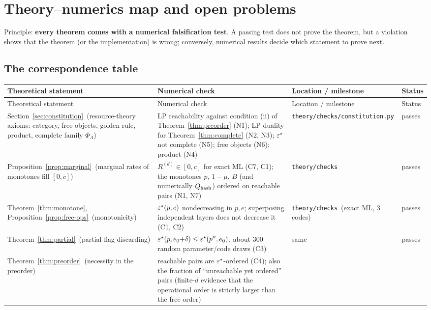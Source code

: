 \section{Theory--numerics map and open problems}\label{sec:map}

Principle: \textbf{every theorem comes with a numerical falsification test}. A passing test does not prove the theorem, but a violation shows that the theorem (or the implementation) is wrong;
conversely, numerical results decide which statement to prove next.

\subsection{The correspondence table}

{\footnotesize
\begin{longtable}{p{3.7cm} p{4.5cm} p{3.2cm} p{2.6cm}}
\toprule
Theoretical statement & Numerical check & Location / milestone & Status \\
\midrule
\endfirsthead
\toprule
Theoretical statement & Numerical check & Location / milestone & Status \\
\midrule
\endhead
Section~\ref{sec:constitution}\ (resource-theory axioms: category, free objects, golden rule, product, complete family $\Phi_\Lambda$) &
LP reachability against condition (ii) of Theorem~\ref{thm:preorder} (N1); LP duality for Theorem~\ref{thm:complete} (N2, N3); $\varepsilon^{\star}$ not complete (N5); free objects (N6); product (N4) &
\texttt{theory/checks/constitution.py} & passes \\
Proposition~\ref{prop:marginal}\ (marginal rates of monotones fill $[0,c]$) &
$R^{(d)}\in[0,c]$ for exact ML (C7, C1); the monotones $p$, $1-\mu$, $B$ (and numerically $Q_{\rm hash}$) ordered on reachable pairs (N1, N7) &
\texttt{theory/checks} & passes \\
Theorem~\ref{thm:monotone}, Proposition~\ref{prop:free-ops}\ (monotonicity) &
$\varepsilon^{\star}(p,e)$ nondecreasing in $p,e$; superposing independent layers does not decrease it (C1, C2) &
\texttt{theory/checks}\ (exact ML, 3 codes) & passes \\
Theorem~\ref{thm:partial}\ (partial flag discarding) &
$\varepsilon^{\star}(p,e_0{+}\delta)\le\varepsilon^{\star}(p'',e_0)$, about $300$ random parameter/code draws (C3) &
same & passes \\
Theorem~\ref{thm:preorder}\ (necessity in the preorder) &
reachable pairs are $\varepsilon^{\star}$-ordered (C4); also the fraction of ``unreachable yet ordered'' pairs (finite-$d$ evidence that the operational order is strictly larger than the free order) &

\end{longtable}}
